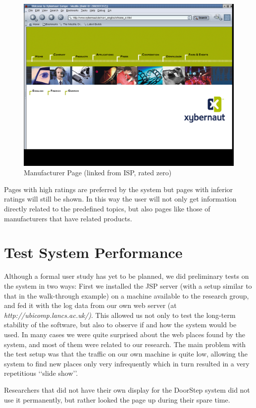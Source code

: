 \documentclass[a4paper]{danarticle}
\theoremstyle{remark}
\begin{document}
      \begin{figure}[ht]
        \centering
        \includegraphics[width=12cm]{xyberhome}
        \caption{Manufacturer Page (linked from ISP, rated zero)}
        \label{xyberhome}
      \end{figure}
      Pages with high
      ratings are preferred by the system but pages with inferior ratings will
      still be shown. In this way the user will not only get information
      directly related to the predefined topics, but also pages like those of
      manufacturers that have related products.
  \section{Test System Performance} 
    Although a formal user study has yet to be planned, we did 
    preliminary tests on the system in two ways: First we installed the JSP 
    server (with a setup similar to that in the walk-through example) 
    on a machine available to the research group, and fed it with the 
    log data from our own web server (at 
    \textit{http://ubicomp.lancs.ac.uk/)}. This allowed us not only to test 
    the long-term stability of the software, but also to observe if and how 
    the system would be used. In many cases we were quite surprised about 
    the web places found by the system, and most of them were related to our 
    research. The main problem with the test setup was that the traffic on 
    our own machine is quite low, allowing the system to find new places 
    only very infrequently which in turn resulted in a very repetitious 
    \lq\lq slide show\rq\rq .
    
    Researchers that did not have their own display 
    for the DoorStep system did not use it permanently, but rather looked 
    the page up during their spare time.
    
\end{document}

